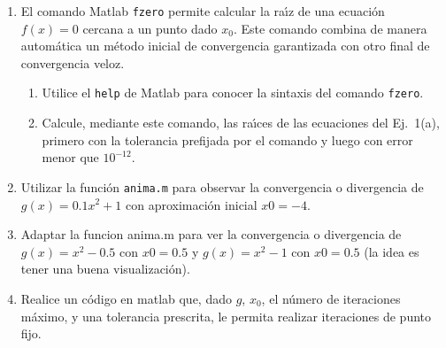 \documentclass[11pt]{article}
\begin{document}
\begin{enumerate}

\item 
El comando {\sc Matlab} {\tt fzero} permite calcular la ra\'{\i}z
de una ecuaci\'on $f(x)=0$ cercana a un punto dado $x_0$. Este comando 
combina de manera autom\'atica un m\'etodo inicial de convergencia 
garantizada con otro final de convergencia veloz.
\begin{enumerate}
\item Utilice el {\tt help} de {\sc Matlab} para conocer la sintaxis del
comando {\tt fzero}.
\item Calcule, mediante este comando, las ra\'{\i}ces de las ecuaciones 
del Ej.\ 1(a), primero con la tolerancia prefijada por el comando y 
luego con error menor que $10^{-12}$.
\end{enumerate}

\item Utilizar la funci\'on {\tt anima.m} para observar la convergencia o divergencia de $g(x)=0.1x^2+1$ con aproximaci\'on inicial $x0=-4$.

\item  Adaptar la funcion anima.m para  ver la convergencia o divergencia de $g(x)=x^2-0.5$ con $x0=0.5$ y $g(x)=x^2-1$ con $x0=0.5$ (la idea es tener una buena visualizaci\'on). 

\item Realice un c\'odigo en matlab que, dado $g$, $x_0$, el n\'umero de iteraciones m\'aximo, y una tolerancia prescrita, le permita realizar iteraciones de punto fijo. 


\end{enumerate}
\end{document}
